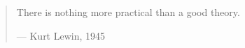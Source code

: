 
\cleardoublepage
\thispagestyle{empty}

\vspace*{3cm}

\begin{quotation}
   \openquote 
  There is nothing more practical than a good theory.~\closequote
\begin{flushright}
    --- Kurt Lewin, 1945 
\end{flushright}
\end{quotation}











